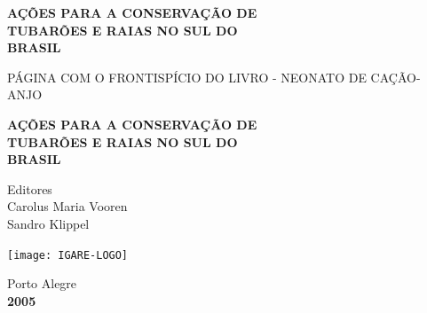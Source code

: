 \documentclass[a4paper,11pt,twoside,showtrims,onecolumn,openright,final]{memoir}
\begin{document}


\pagestyle{empty}


\begin{center}

\vspace*{2cm}



{\huge \bfseries \sffamily 
AÇÕES PARA A CONSERVAÇÃO DE \\ \vspace{0.4\baselineskip}
TUBARÕES E RAIAS NO SUL DO  \\ \vspace{0.5\baselineskip}
BRASIL
}


\end{center}

\newpage


PÁGINA COM O FRONTISPÍCIO DO LIVRO - NEONATO DE CAÇÃO-ANJO

\newpage


\begin{center}

\vspace*{2cm}


{\huge \bfseries \sffamily 
AÇÕES PARA A CONSERVAÇÃO DE \\ \vspace{0.4\baselineskip}
TUBARÕES E RAIAS NO SUL DO \\ \vspace{0.5\baselineskip}
BRASIL}

\vspace{2cm}

\begin{large}
\begin{textsf}
Editores \\
Carolus Maria Vooren \\
Sandro Klippel \\
\end{textsf}
\end{large}

\vspace{8cm}

\texttt{[image: IGARE-LOGO]}

\vspace{0.5cm}

\textsf{Porto Alegre} \\
\textsf{\bfseries 2005}

\end{center}
\end{document}
